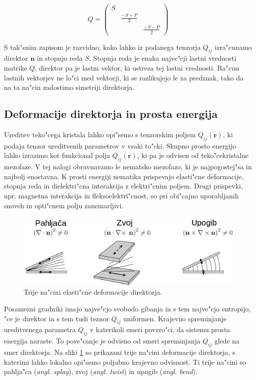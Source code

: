 \documentclass[a4paper,10pt]{article}
\renewcommand{\vec}{\mathbf}
\newcommand{\angl}[1]{(\textit{angl. #1})}
\begin{document}
\begin{equation}
 Q = \begin{pmatrix}
  S &   & \\
  & \frac{-S+P}{2} & \\
  & & \frac{-S-P}{2}
 \end{pmatrix}
\end{equation}

S tak"snim zapisom je razvidno, kako lahko iz podanega tenzorja $Q_{ij}$ izra"cunamo direktor $\vec n$ in stopnjo reda $S$. 
Stopnja reda je enaka najve"cji lastni vrednosti matrike $Q$, direktor pa je lastni vektor, ki ustreza tej lastni vrednosti. 
Ra"cun lastnih vektorjev ne lo"ci med vektorji, ki se razlikujejo le za predznak, tako da na ta na"cin zadostimo simetriji direktorja. 

\subsection{Deformacije direktorja in prosta energija}

Ureditev teko"cega kristala lahko opi"semo s tenzorskim poljem $Q_{ij}(\vec r)$, ki podaja tenzor ureditvenih parametrov v vsaki to"cki. 
Skupno prosto energijo lahko izrazimo kot funkcional polja $Q_{ij}(\vec r)$, ki pa je odvisen od teko"cekristalne mezofaze. 
V tej nalogi obravnavamo le nematsko mezofazo, ki je najpogostej"sa in najbolj enostavna. 
K prosti energiji nematika prispevajo elasti"cne deformacije, stopnja reda in dielektri"cna interakcija z elektri"cnim poljem. 
Drugi prispevki, npr. magnetna interakcija in fleksoelektri"cnost, so pri obi"cajno uporabljanih snoveh in opti"cnem polju zanemarljivi.

\begin{figure}[h]
\begin{center}
  \includegraphics[width=.7\textwidth]{./Slike/tsb_slo}
  \caption{Trije na"cini elasti"cne deformacije direktorja. }
\label{fig:tsb}
\end{center}
\end{figure}
Posamezni gradniki imajo najve"cjo svobodo gibanja in s tem najve"cjo entropijo, "ce je direktor in s tem tudi teznor $Q_{ij}$ uniformen. 
Krajevno spreminjanje ureditvenega parametra $Q_{ij}$ v katerikoli smeri povzro"ci, da sistemu prosta energija naraste. 
To pove"canje je odvisno od smeri spreminjanja $Q_{ij}$ glede na smer direktorja. 
Na sliki \ref{fig:tsb} so prikazani trije na"cini deformacije direktorja, s katerimi lahko lokalno opi"semo poljubno krajevno odvisnost. 
Ti trije na"cini so pahlja"ca \angl{splay}, zvoj \angl{twist} in upogib \angl{bend}. 
\end{document}
